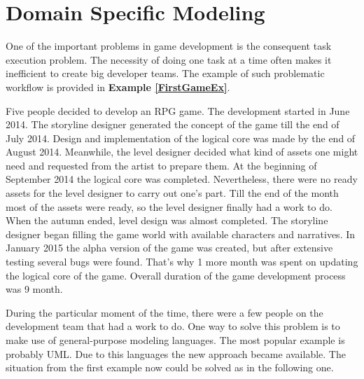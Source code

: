 \section{Domain Specific Modeling}

One of the important problems in game development is the consequent task execution problem. The necessity of doing one task at a time often makes it inefficient to create big developer teams. The example of such problematic workflow is provided in \textbf{Example  \ref{FirstGameEx}}.

\begin{example}
\label{FirstGameEx}
   Five people decided to develop an RPG game. The development started in June 2014. The storyline designer generated the concept of the game till the end of July 2014. Design and implementation of the logical core was made by the end  of August 2014. Meanwhile, the level designer decided what kind of assets one might need and requested from the artist to prepare them. At the beginning of September 2014 the logical core was completed. Nevertheless, there were no ready assets for the level designer to carry out one's part. Till the end of the month most of the assets were ready, so the level designer finally had a work to do. When the autumn ended, level design was almost completed. The storyline designer began filling the game world with available characters and narratives. In January 2015 the alpha version of the game was created, but after extensive testing several bugs were found. That's why 1 more month was spent on updating the logical core of the game. Overall duration of the game development process was 9 month.
\end{example}\par
 During the particular moment of the time, there were a few people on the development team that had a work to do.
 One way to solve this problem is to make use of general-purpose modeling languages.
 The most popular example is probably UML. Due to this languages the new approach became available. The situation from the first example now could be solved as in the following one.
